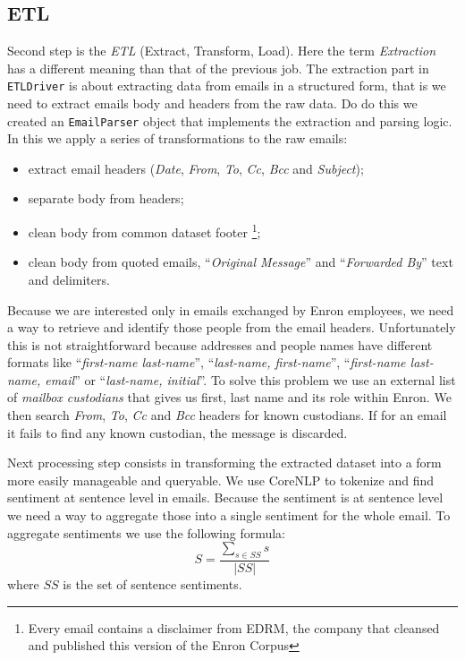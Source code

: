 \documentclass{vldb}
\begin{document}
\subsection{ETL}
\label{sub-sec:etl}
Second step is the \textit{ETL} (Extract, Transform, Load). Here the term
\textit{Extraction} has a different meaning than that of the previous job.
The extraction part in \texttt{ETLDriver} is about extracting data from emails
in a structured form, that is we need to extract emails body and headers from
the raw data. Do do this we created an \texttt{EmailParser} object that
implements the extraction and parsing logic. In this we apply a series of
transformations to the raw emails:
\begin{itemize}
	\item extract email headers (\textit{Date}, \textit{From}, \textit{To},
		\textit{Cc}, \textit{Bcc} and \textit{Subject});
	\item separate body from headers;
	\item clean body from common dataset footer \footnote{Every email contains a
		disclaimer from EDRM, the company that cleansed and published this
		version of the Enron Corpus};
	\item clean body from quoted emails, ``\textit{Original Message}'' and
		``\textit{Forwarded By}'' text and delimiters.
\end{itemize}

Because we are interested only in emails exchanged by Enron employees, we need a
way to retrieve and identify those people from the email headers. Unfortunately
this is not straightforward because addresses and people names have different
formats like ``\textit{first-name last-name}'', ``\textit{last-name, first-name}'',
``\textit{first-name last-name, email}'' or ``\textit{last-name, initial}''.
To solve this problem we use an external list of \textit{mailbox custodians}
that gives us first, last name and its role within Enron. We then search
\textit{From}, \textit{To}, \textit{Cc} and \textit{Bcc} headers for known
custodians. If for an email it fails to find any known custodian, the message is
discarded.

Next processing step consists in transforming the extracted dataset into a form
more easily manageable and queryable. We use CoreNLP to tokenize and find
sentiment at sentence level in emails. Because the sentiment is at sentence
level we need a way to aggregate those into a single sentiment for the whole
email. To aggregate sentiments we use the following formula:
\begin{equation}
	S = \frac{\sum_{s \in SS} s}{|SS|}
	\label{eq:sentiment-aggregation}
\end{equation}
where $SS$ is the set of sentence sentiments.
\end{document}
